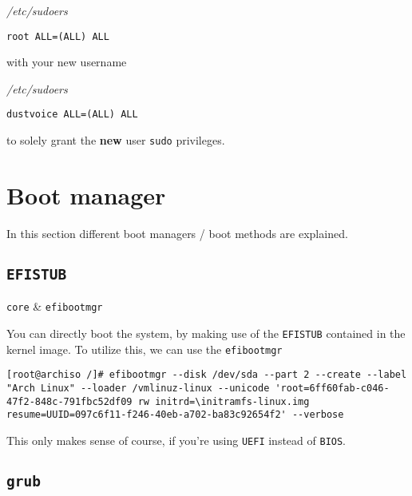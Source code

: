 \documentclass[10pt]{dustdoc}
\begin{document}
\begin{mintedlisting}
    \caption*{\textit{/etc/sudoers}}
    \begin{verbatim}
root ALL=(ALL) ALL
    \end{verbatim}
\end{mintedlisting}

\noindent
with your new username

\begin{mintedlisting}
    \caption*{\textit{/etc/sudoers}}
    \begin{verbatim}
dustvoice ALL=(ALL) ALL
    \end{verbatim}
\end{mintedlisting}

\noindent
to solely grant the \textbf{new} user \texttt{sudo} privileges.

\section{Boot manager}
\label{sec:boot-manager}

In this section different boot managers / boot methods are explained.

\subsection{\texttt{EFISTUB}}
\label{sec:efistub}

\begin{packagetable}
    \texttt{core} & \texttt{efibootmgr} \\
\end{packagetable}

You can directly boot the system, by making use of the \texttt{EFISTUB} contained in the kernel image.
To utilize this, we can use the \texttt{efibootmgr}

\begin{verbatim}
[root@archiso /]# efibootmgr --disk /dev/sda --part 2 --create --label "Arch Linux" --loader /vmlinuz-linux --unicode 'root=6ff60fab-c046-47f2-848c-791fbc52df09 rw initrd=\initramfs-linux.img resume=UUID=097c6f11-f246-40eb-a702-ba83c92654f2' --verbose
\end{verbatim}

\begin{NOTE}
    This only makes sense of course, if you're using \texttt{UEFI} instead of \texttt{BIOS}.
\end{NOTE}

\subsection{\texttt{grub}}
\label{sec:grub}
\end{document}
